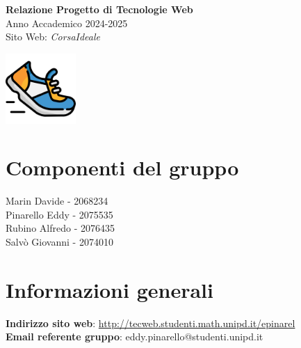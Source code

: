 \documentclass[a4paper, 12pt]{article}
\begin{document}
\begin{titlepage}

\begin{center}
    \vspace*{0.5cm}
    \Huge \textbf{Relazione Progetto di Tecnologie Web} \\
    \vspace{0.5cm}
    \Large Anno Accademico 2024-2025\\
    \vspace{1cm}
    \Huge Sito Web: \textit{CorsaIdeale} \\
    \vspace{0.5cm} 

    \includegraphics[width=0.2\textwidth]{logo.png}
\end{center}

\section*{\centering Componenti del gruppo}
\begin{center}
    Marin Davide - 2068234\\
    \vspace{0.2cm}
    Pinarello Eddy - 2075535\\
    \vspace{0.2cm}
    Rubino Alfredo - 2076435\\
    \vspace{0.2cm}
    Salvò Giovanni - 2074010
\end{center}

\section*{\centering Informazioni generali}
    \begin{center}
    \textbf{Indirizzo sito web}: \url{http://tecweb.studenti.math.unipd.it/epinarel}\\
    \vspace{0.2cm}
    \textbf{Email referente gruppo}: eddy.pinarello@studenti.unipd.it
\end{center}


\end{titlepage}
\end{document}
